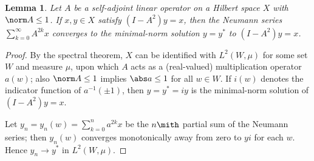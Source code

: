 \documentclass[10pt]{article}
\theoremstyle{plain}
\newtheorem{lemma}[theorem]{Lemma}
\theoremstyle{definition}
\theoremstyle{remark}
\numberwithin{theorem}{section}
\numberwithin{example}{section}
\numberwithin{equation}{section}
\numberwithin{figure}{section}
\begin{document}
\begin{lemma}
	Let $A$ be a self-adjoint linear operator on a Hilbert space $X$ with $\norm A\leq 1$. If $x,y\in X$ satisfy $(I-A^2)y=x$, then the Neumann series $\sum_{k=0}^\infty A^{2k}x$ converges to the minimal-norm solution $y=y^*$ to $(I-A^2)y=x$.
	\label{l:only-neumann}
\end{lemma}
\begin{proof}
	By the spectral theorem, $X$ can be identified with $L^2(W,\mu)$ for some set $W$ and measure $\mu$, upon which $A$ acts as a (real-valued) multiplication operator $a(w)$; also $\norm A\leq 1$ implies $\abs a\leq1$ for all $w\in W$. If $i(w)$ denotes the indicator function of $a^{-1}(\pm1)$, then $y=y^*=iy$ is the minimal-norm solution of $(I-A^2)y=x$.
	
	Let $y_n=y_n(w)=\sum_{k=0}^n a^{2k} x$ be the $n\mith$ partial sum of the Neumann series; then $y_n(w)$ converges monotonically away from zero to $yi$ for each $w$. Hence $y_n\to y^*$ in $L^2(W,\mu)$.
\end{proof}
\end{document}
